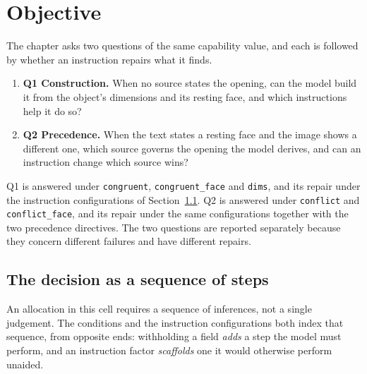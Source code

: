 %
%


\section{Objective}

The chapter asks two questions of the same capability value, and each is
followed by whether an instruction repairs what it finds.

\begin{enumerate}
  \item \textbf{Q1 Construction.} When no source states the opening, can the
        model build it from the object's dimensions and its resting face, and
        which instructions help it do so?
  \item \textbf{Q2 Precedence.} When the text states a resting face and the
        image shows a different one, which source governs the opening the model
        derives, and can an instruction change which source wins?
\end{enumerate}

Q1 is answered under \texttt{congruent}, \texttt{congruent\_face} and
\texttt{dims}, and its repair under the instruction configurations of
Section~\ref{sec:ex2-steps}. Q2 is answered under \texttt{conflict} and
\texttt{conflict\_face}, and its repair under the same configurations together
with the two precedence directives. The two questions are reported separately
because they concern different failures and have different repairs.


\subsection{The decision as a sequence of steps}
\label{sec:ex2-steps}

An allocation in this cell requires a sequence of inferences, not a single
judgement. The conditions and the instruction configurations both index that
sequence, from opposite ends: withholding a field \emph{adds} a step the model
must perform, and an instruction factor \emph{scaffolds} one it would otherwise
perform unaided.

